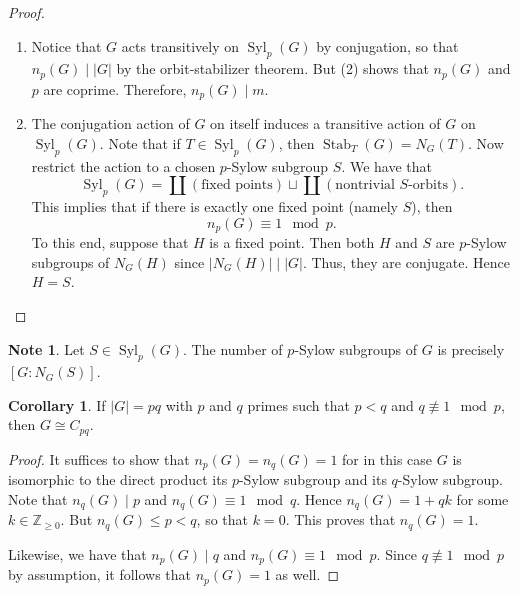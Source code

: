 \documentclass[10pt,letterpaper,cm]{nupset}
\theoremstyle{definition}
\newtheorem{note}[definition]{Note}
\theoremstyle{theorem}
\newtheorem{corollary}[definition]{Corollary}
\theoremstyle{remark}
\newcommand{\Z}{\mathbb Z}
\newcommand{\1}{\mathbf{1}}
\newcommand{\0}{\vec 0}
\DeclareMathOperator{\stab}{Stab}
\DeclareMathOperator{\Syl}{Syl}
\begin{document}
\begin{proof} $ $
\begin{enumerate}
\item Notice that $G$ acts transitively on $\Syl_p(G)$ by conjugation, so that $n_p(G) \mid \left\lvert{G}\right\rvert$ by the orbit-stabilizer theorem. But (2) shows that $n_p(G)$ and $p$ are coprime. Therefore, $n_p(G) \mid m$.
\item The conjugation action of $G$ on itself induces a transitive action of $G$ on $\Syl_p(G)$. Note that if $T \in \Syl_p(G)$, then $\stab_T(G) = N_G(T)$. Now restrict the action to a chosen $p$-Sylow subgroup $S$. We have  that $$\Syl_p(G) = \coprod{\left(\text{fixed points}\right)}\sqcup \coprod{\left(\text{nontrivial }S\text{-orbits}\right)}.$$ This implies that if there is exactly one fixed point (namely $S$), then $$n_p(G) \equiv 1 \mod p.$$ To this end, suppose that $H$ is a fixed point. Then both $H$ and $S$  are $p$-Sylow subgroups of $N_G(H)$ since $\left\lvert{N_G(H)}\right\rvert \mid \left\lvert{G}\right\rvert$. Thus, they are conjugate. Hence $H=S$.
\end{enumerate}
\end{proof}

\begin{note}
Let $S\in \Syl_p(G)$. The number of $p$-Sylow subgroups of $G$ is precisely $\left[G : N_G(S)\right]$.
\end{note}

\begin{corollary}
If $\left\lvert{G}\right\rvert = pq$ with $p$ and $q$ primes such that $p<q$ and $q \not \equiv 1 \mod p$, then $G\cong C_{pq}$. 
\end{corollary}
\begin{proof}
It suffices to show that $n_p(G) =n_q(G)=1$ for in this case $G$ is isomorphic to the direct product its $p$-Sylow subgroup and its $q$-Sylow subgroup. Note that $n_q(G)\mid p$ and $n_q(G) \equiv 1 \mod q$. Hence $n_q(G) = 1 + qk$ for some $k\in \Z_{\geq 0}$. But $n_q(G) \leq p <q$, so that $k=0$. This proves that $n_q(G)=1$.

Likewise, we have that $n_p(G)\mid q$ and $n_p(G) \equiv 1 \mod p$. Since $q \not \equiv 1 \mod p$ by assumption, it follows that $n_p(G) =1$ as well.
\end{proof}

\medskip
\end{document}
